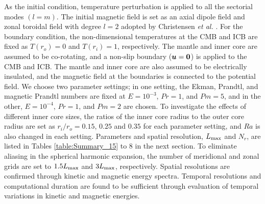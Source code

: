 As the initial condition, temperature perturbation is applied to all the sectorial modes $(l = m)$. 
The initial magnetic field is set as an axial dipole field and zonal toroidal field with degree $l=2$ adopted by Christensen {\it et al.} . 
For the boundary condition, the non-dimensional temperatures at the CMB and ICB are fixed as $T(r_{o}) = 0$ and  $T(r_{i}) = 1$, respectively. 
The mantle and inner core are assumed to be co-rotating, and a non-slip boundary ($\mbox{\boldmath$u$} = \mbox{\boldmath$0$}$) is applied to the CMB and ICB. 
The mantle and inner core are also assumed to be electrically insulated, and the magnetic field at the boundaries is connected to the potential field.
We choose two parameter settings; %
in one setting, the Ekman, Prandtl, and magnetic Prandtl numbers are fixed at $E = 10^{-3}$, $Pr = 1$, and $Pm = 5$, and in the other, $E = 10^{-4}$, $Pr = 1$, and $Pm = 2$ are chosen. 
To investigate the effects of different inner core sizes, the ratios of the inner core radius to the outer core radius are set as $r_{i} / r_{o} = 0.15$, $0.25$ and $0.35$ for each parameter setting, and $Ra$ is also changed in each setting. 
Parameters and spatial resolution, $L_{\rm max}$ and $N_{r}$, are listed in Tables \ref{table:Summary_15} to 8 
in the next section. 
To eliminate aliasing in the spherical harmonic expansion, the number of meridional and zonal grids are set to $1.5 L_{\rm max}$ and $3 L_{\rm max}$, respectively.
{\color{red}
Spatial resolutions are confirmed through kinetic and magnetic energy spectra.
Temporal resolutions and 
{\color{blue} 
computational
} 
duration are found to be sufficient through evaluation of temporal variations in kinetic and magnetic energies.
}

